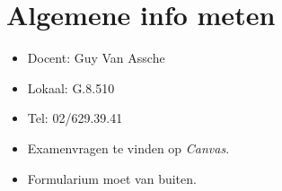 \documentclass[12pt]{article}
\begin{document}
    \maketitle

    \section{Algemene info meten}%
    \label{sec:Algemene_info_meten}
    \begin{itemize}
    	\item Docent: Guy Van Assche
		\item Lokaal: G.8.510
		\item Tel: 02/629.39.41
		\item Examenvragen te vinden op \emph{Canvas}.
		\item Formularium moet van buiten.
    \end{itemize}
\end{document}
